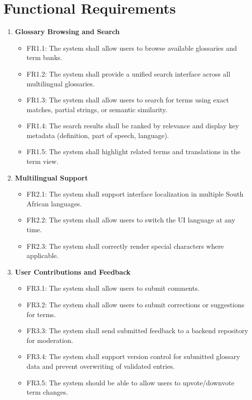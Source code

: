 \documentclass[12pt]{article}
\begin{document}
\section{Functional Requirements}

\begin{enumerate}[label=FR\arabic*:, leftmargin=2.5em]

    \item \textbf{Glossary Browsing and Search}
    \begin{itemize}
        \item FR1.1: The system shall allow users to browse available glossaries and term banks.
        \item FR1.2: The system shall provide a unified search interface across all multilingual glossaries.
        \item FR1.3: The system shall allow users to search for terms using exact matches, partial strings, or semantic similarity.
        \item FR1.4: The search results shall be ranked by relevance and display key metadata (definition, part of speech, language).
        \item FR1.5: The system shall highlight related terms and translations in the term view.
    \end{itemize}

    \item \textbf{Multilingual Support}
    \begin{itemize}
        \item FR2.1: The system shall support interface localization in multiple South African languages.
        \item FR2.2: The system shall allow users to switch the UI language at any time.
        \item FR2.3: The system shall correctly render special characters where applicable.
    \end{itemize}

    \item \textbf{User Contributions and Feedback}
    \begin{itemize}
        \item FR3.1: The system shall allow users to submit comments.
        \item FR3.2: The system shall allow users to submit corrections or suggestions for terms.
        \item FR3.3: The system shall send submitted feedback to a backend repository for moderation.
        \item FR3.4: The system shall support version control for submitted glossary data and prevent overwriting of validated entries.
        \item FR3.5: The system should be able to allow users to upvote/downvote term changes.
    \end{itemize}


\end{enumerate}
\end{document}
